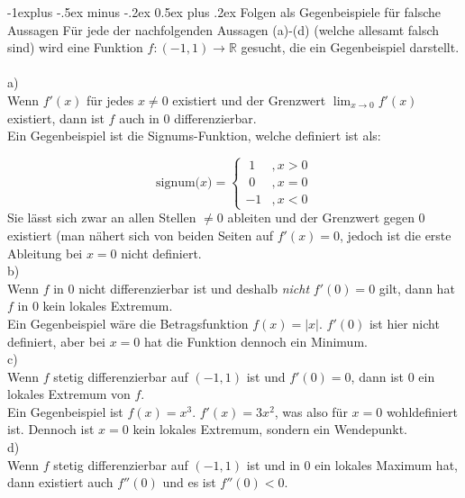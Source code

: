 \documentclass[12pt,a4paper^, twocolumn]{article}
\makeatletter
\renewcommand{\subsection}{\@startsection{subsection}{2}{0mm}%
                                {-1explus -.5ex minus -.2ex}%
                                {0.5ex plus .2ex}%
                                {\normalfont\normalsize\bfseries}}
\makeatother
\begin{document}
\subsection{Folgen als Gegenbeispiele für falsche Aussagen}
Für jede der nachfolgenden Aussagen (a)-(d) (welche allesamt falsch sind) wird eine Funktion $f:(-1,1) \to \mathbb{R}$ gesucht, die ein Gegenbeispiel darstellt. \\\\
a)\\
Wenn $f'(x)$ für jedes $x \neq 0$ existiert und der Grenzwert $\lim_{x \to 0} f'(x)$ existiert, dann ist $f$ auch in $0$ differenzierbar. \\

Ein Gegenbeispiel ist die Signums-Funktion, welche definiert ist als:

$$ \text{signum(}x) = \begin{cases} \; 1 & ,x > 0 \\ \; 0 & ,x = 0 \\ -1 & ,x < 0 \end{cases} $$Sie lässt sich zwar an allen Stellen $ \neq 0$ ableiten und der Grenzwert gegen 0 existiert (man nähert sich von beiden Seiten auf $f'(x) = 0$, jedoch ist die erste Ableitung bei $x=0$ nicht definiert.
\\


b)\\
Wenn $f$ in $0$ nicht differenzierbar ist und deshalb \emph{nicht} $f'(0) = 0$ gilt, dann hat $f$ in $0$ kein lokales Extremum. \\

Ein Gegenbeispiel wäre die Betragsfunktion $f(x) = |x|$. $f'(0)$ ist hier nicht definiert, aber bei $x=0$ hat die Funktion dennoch ein Minimum.\\


c)\\
Wenn $f$ stetig differenzierbar auf $(-1,1)$ ist und $f'(0) = 0$, dann ist $0$ ein lokales Extremum von $f$. \\

Ein Gegenbeispiel ist $f(x) = x^3$. $f'(x) = 3x^2$, was also für $x=0$ wohldefiniert ist. Dennoch ist $x=0$ kein lokales Extremum, sondern ein Wendepunkt.\\


d)\\
Wenn $f$ stetig differenzierbar auf $(-1,1)$ ist und in $0$ ein lokales Maximum hat, dann existiert auch $f''(0)$ und es ist $f''(0) < 0$.\\
\end{document}
